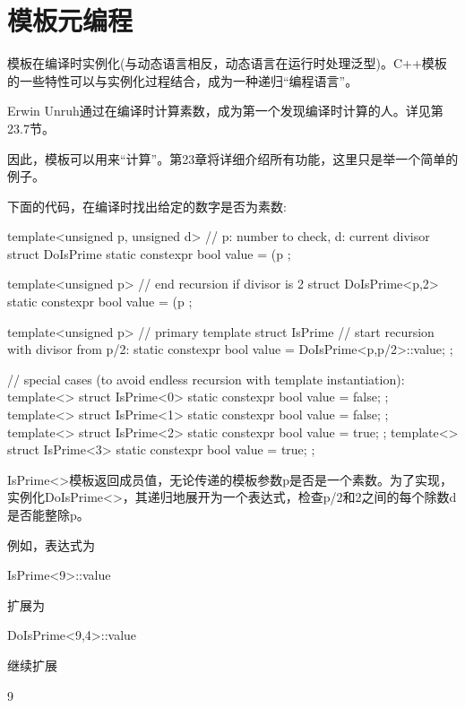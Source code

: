 \section{模板元编程}
模板在编译时实例化(与动态语言相反，动态语言在运行时处理泛型)。C++模板的一些特性可以与实例化过程结合，成为一种递归“编程语言”。

\begin{notice}
Erwin Unruh通过在编译时计算素数，成为第一个发现编译时计算的人。详见第23.7节。
\end{notice}

因此，模板可以用来“计算”。第23章将详细介绍所有功能，这里只是举一个简单的例子。

下面的代码，在编译时找出给定的数字是否为素数:

\begin{cpp}
template<unsigned p, unsigned d> // p: number to check, d: current divisor
struct DoIsPrime {
	static constexpr bool value = (p%
};

template<unsigned p> // end recursion if divisor is 2
struct DoIsPrime<p,2> {
	static constexpr bool value = (p%
};

template<unsigned p> // primary template
struct IsPrime {
	// start recursion with divisor from p/2:
	static constexpr bool value = DoIsPrime<p,p/2>::value;
};

// special cases (to avoid endless recursion with template instantiation):
template<>
struct IsPrime<0> { static constexpr bool value = false; };
template<>
struct IsPrime<1> { static constexpr bool value = false; };
template<>
struct IsPrime<2> { static constexpr bool value = true; };
template<>
struct IsPrime<3> { static constexpr bool value = true; };
\end{cpp}

IsPrime<>模板返回成员值，无论传递的模板参数p是否是一个素数。为了实现，实例化DoIsPrime<>，其递归地展开为一个表达式，检查p/2和2之间的每个除数d是否能整除p。

例如，表达式为

\begin{cpp}
IsPrime<9>::value
\end{cpp}

扩展为

\begin{cpp}
DoIsPrime<9,4>::value
\end{cpp}

继续扩展

\begin{cpp}
9%
\end{cpp}

